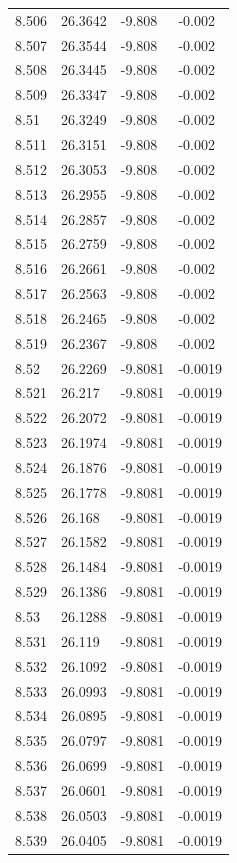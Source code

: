 \begin{tabular}{llll}
8.506 & 26.3642 & -9.808 & -0.002 \\
8.507 & 26.3544 & -9.808 & -0.002 \\
8.508 & 26.3445 & -9.808 & -0.002 \\
8.509 & 26.3347 & -9.808 & -0.002 \\
8.51 & 26.3249 & -9.808 & -0.002 \\
8.511 & 26.3151 & -9.808 & -0.002 \\
8.512 & 26.3053 & -9.808 & -0.002 \\
8.513 & 26.2955 & -9.808 & -0.002 \\
8.514 & 26.2857 & -9.808 & -0.002 \\
8.515 & 26.2759 & -9.808 & -0.002 \\
8.516 & 26.2661 & -9.808 & -0.002 \\
8.517 & 26.2563 & -9.808 & -0.002 \\
8.518 & 26.2465 & -9.808 & -0.002 \\
8.519 & 26.2367 & -9.808 & -0.002 \\
8.52 & 26.2269 & -9.8081 & -0.0019 \\
8.521 & 26.217 & -9.8081 & -0.0019 \\
8.522 & 26.2072 & -9.8081 & -0.0019 \\
8.523 & 26.1974 & -9.8081 & -0.0019 \\
8.524 & 26.1876 & -9.8081 & -0.0019 \\
8.525 & 26.1778 & -9.8081 & -0.0019 \\
8.526 & 26.168 & -9.8081 & -0.0019 \\
8.527 & 26.1582 & -9.8081 & -0.0019 \\
8.528 & 26.1484 & -9.8081 & -0.0019 \\
8.529 & 26.1386 & -9.8081 & -0.0019 \\
8.53 & 26.1288 & -9.8081 & -0.0019 \\
8.531 & 26.119 & -9.8081 & -0.0019 \\
8.532 & 26.1092 & -9.8081 & -0.0019 \\
8.533 & 26.0993 & -9.8081 & -0.0019 \\
8.534 & 26.0895 & -9.8081 & -0.0019 \\
8.535 & 26.0797 & -9.8081 & -0.0019 \\
8.536 & 26.0699 & -9.8081 & -0.0019 \\
8.537 & 26.0601 & -9.8081 & -0.0019 \\
8.538 & 26.0503 & -9.8081 & -0.0019 \\
8.539 & 26.0405 & -9.8081 & -0.0019 \\

\end{tabular}
